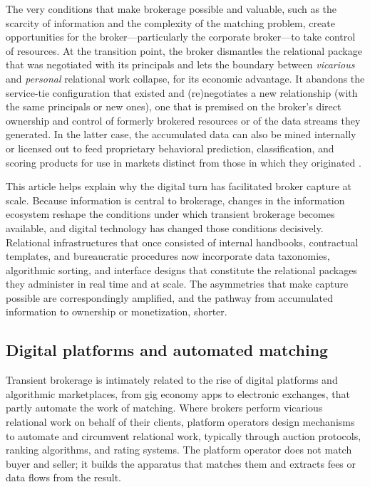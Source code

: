 \documentclass[
]{article}
\begin{document}
The very conditions that make brokerage possible and valuable, such as the scarcity of information and the complexity of the matching problem, create opportunities for the broker---particularly the corporate broker---to take control of resources. At the transition point, the broker dismantles the relational package that was negotiated with its principals and lets the boundary between \emph{vicarious} and \emph{personal} relational work collapse, for its economic advantage. It abandons the service-tie configuration that existed and (re)negotiates a new relationship (with the same principals or new ones), one that is premised on the broker's direct ownership and control of formerly brokered resources or of the data streams they generated. In the latter case, the accumulated data can also be mined internally or licensed out to feed proprietary behavioral prediction, classification, and scoring products \autocite{fourcadeSeeingMarket2017,fourcadeOrdinalSociety2024} for use in markets distinct from those in which they originated \autocite{viljoenRelationalTheoryData2021,zuboffAgeSurveillanceCapitalism2019}.

This article helps explain why the digital turn has facilitated broker capture at scale. Because information is central to brokerage, changes in the information ecosystem reshape the conditions under which transient brokerage becomes available, and digital technology has changed those conditions decisively. Relational infrastructures that once consisted of internal handbooks, contractual templates, and bureaucratic procedures now incorporate data taxonomies, algorithmic sorting, and interface designs that constitute the relational packages they administer in real time and at scale. The asymmetries that make capture possible are correspondingly amplified, and the pathway from accumulated information to ownership or monetization, shorter.

\subsection{Digital platforms and automated matching}

Transient brokerage is intimately related to the rise of digital platforms and algorithmic marketplaces, from gig economy apps to electronic exchanges, that partly automate the work of matching. Where brokers perform vicarious relational work on behalf of their clients, platform operators design mechanisms to automate and circumvent relational work, typically through auction protocols, ranking algorithms, and rating systems. The platform operator does not match buyer and seller; it builds the apparatus that matches them and extracts fees or data flows from the result.
\end{document}
